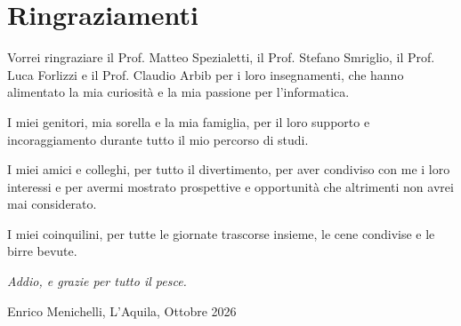 \thispagestyle{plain}			%
\section*{Ringraziamenti}
Vorrei ringraziare il Prof. Matteo Spezialetti, il Prof. Stefano Smriglio, il Prof. Luca Forlizzi e il Prof. Claudio Arbib per i loro insegnamenti, che hanno alimentato la mia curiosità e la mia passione per l'informatica.

I miei genitori, mia sorella e la mia famiglia, per il loro supporto e incoraggiamento durante tutto il mio percorso di studi.

I miei amici e colleghi, per tutto il divertimento, per aver condiviso con me i loro interessi e per avermi mostrato prospettive e opportunità che altrimenti non avrei mai considerato.

I miei coinquilini, per tutte le giornate trascorse insieme, le cene condivise e le birre bevute.

\bigskip

\emph{Addio, e grazie per tutto il pesce.}

\vspace{1.5cm}
\hfill
Enrico Menichelli, L'Aquila, Ottobre 2026

\newpage				%
\thispagestyle{empty}
\mbox{}